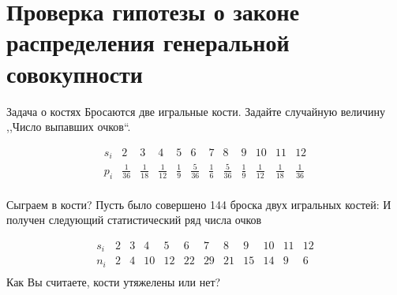 \documentclass[unicode,11pt,notheorems,xcolor=table]{beamer}
\begin{document}



\section{Проверка гипотезы о законе распределения генеральной совокупности}

\begin{frame}{Задача о костях}{}
    Бросаются две игральные кости.
    Задайте случайную величину ,,Число выпавших очков``.
    
    $$
    \begin{array}{c|ccccccccccc}
        s_i & 2 & 3 & 4 & 5 & 6 & 7 & 8& 9& 10& 11& 12 \\
        \hline
        p_i & \frac{1}{36} & \frac{1}{18} & \frac{1}{12} & \frac{1}{9} & \frac{5}{36} & \frac{1}{6} & \frac{5}{36} & \frac{1}{9}& \frac{1}{12}& \frac{1}{18}& \frac{1}{36}\\
    \end{array}        
    $$
\end{frame}

\begin{frame}{Сыграем в кости?}{}
    Пусть было совершено 144 броска двух игральных костей:
    И получен следующий статистический ряд числа очков
    
    $$
    \begin{array}{c|ccccccccccc}
        s_i & 2 & 3 & 4 & 5 & 6 & 7 & 8& 9& 10& 11& 12 \\
        \hline
        n_i & 2 & 4 & 10 & 12 & 22 & 29 & 21& 15& 14& 9& 6 \\
    \end{array}        
    $$
    Как Вы считаете, кости утяжелены или нет?
\end{frame}
\end{document}
